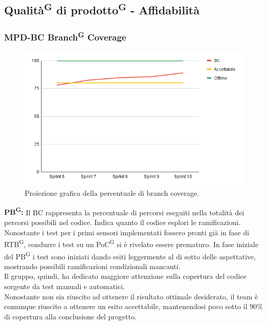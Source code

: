 \documentclass[8pt]{article}
\newcommand{\glossterm}[1]{#1\textsuperscript{G}} %
\begin{document}
\subsection{\glossterm{Qualità} di \glossterm{prodotto} - Affidabilità}
\subsubsection{MPD-BC \glossterm{Branch} Coverage}
\begin{figure}[h!]
    \centering
    \includegraphics[width=1\textwidth]{images_pdq/BC.png}
    \caption{Proiezione grafica della percentuale di branch coverage.}
    \label{fig:Proiezione grafica della percentuale di branch coverage}
\end{figure}
\textbf{\glossterm{PB}:} Il BC rappresenta la percentuale di percorsi eseguiti nella totalità dei percorsi possibili nel codice. Indica quanto il codice esplori le ramificazioni. Nonostante i test per i primi sensori implementati fossero pronti già in fase di \glossterm{RTB}, condurre i test su un \glossterm{PoC} si è rivelato essere prematuro. In fase iniziale del \glossterm{PB} i test sono iniziati dando esiti leggermente al di sotto delle aspettative, mostrando possibili ramificazioni condizionali mancanti. \\ Il gruppo, quindi, ha dedicato maggiore attenzione sulla copertura del codice sorgente da test manuali e automatici. \\ Nonostante non sia riuscito ad ottenere il risultato ottimale desiderato, il team è comunque riuscito a ottenere un esito accettabile, mantenendosi poco sotto il 90\% di copertura alla conclusione del progetto.
\clearpage
\end{document}
